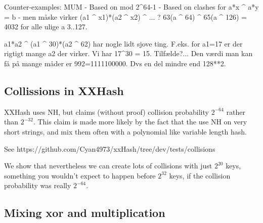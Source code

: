 Counter-examples:
MUM
   - Based on mod 2^64-1
   - Based on clashes for a*x ^ a*y = b
   - men måske virker (a1 ^ x1)*(a2 ^ x2) ^ ... ?
   63(a ^ 64) ^ 65(a ^ 126) = 4032
   for alle ulige a 3..127.


   a1*a2 ^ (a1 ^ 30)*(a2 ^ 62)
   har nogle lidt sjove ting. F.eks. for a1=17 er der rigtigt mange a2 der virker.
   Vi har 17^30 = 15. Tilfælde?...
   Den værdi man kan få på mange måder er 992=1111100000. Dvs en del mindre end 128**2.

\subsection{Collissions in XXHash}
XXHash uses NH, but claims (without proof) collision probability $2^{-64}$ rather than $2^{-32}$.
This claim is made more likely by the fact that the use NH on very short strings, and mix them often with a polynomial like variable length hash.

See https://github.com/Cyan4973/xxHash/tree/dev/tests/collisions

We show that nevertheless we can create lots of collisions with just $2^{20}$ keys, something you wouldn't expect to happen before $2^{32}$ keys, if the collision probability was really $2^{-64}$.

\subsection{Mixing xor and multiplication}

